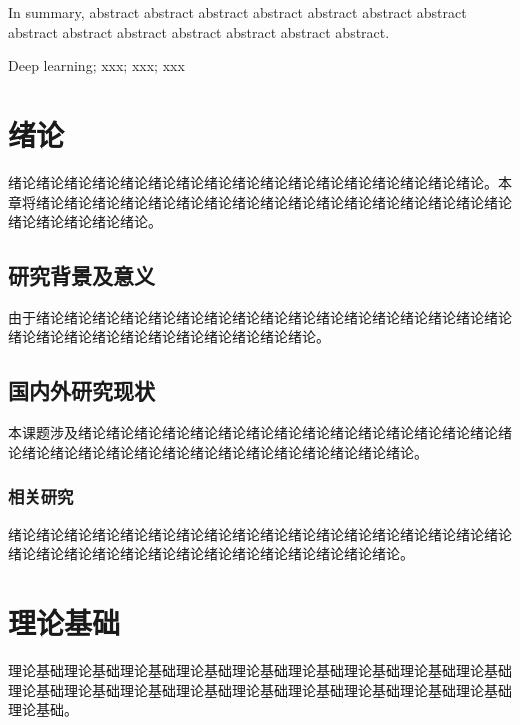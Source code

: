 \documentclass[UTF-8,a4paper,twoside]{article}
\numberwithin{equation}{section} %
\numberwithin{table}{section} %
\numberwithin{figure}{section} %
\begin{document}
In summary, abstract abstract abstract abstract abstract abstract abstract abstract abstract abstract abstract abstract abstract abstract.

\noindent{}Deep learning; xxx; xxx; xxx

\newpage
\thispagestyle{pre}
\begin{center}
	\tableofcontents
\end{center}
\thispagestyle{pre}

\newpage
\pagestyle{main}
\setcounter{page}{1}
\section{绪论}
绪论绪论绪论绪论绪论绪论绪论绪论绪论绪论绪论绪论绪论绪论绪论绪论绪论。本章将绪论绪论绪论绪论绪论绪论绪论绪论绪论绪论绪论绪论绪论绪论绪论绪论绪论绪论绪论绪论绪论绪论。

\subsection{研究背景及意义}
由于绪论\cite{示例期刊论文}绪论绪论绪论绪论绪论绪论绪论绪论绪论绪论\cite{示例书籍}绪论绪论绪论绪论绪论绪论绪论绪论绪论绪论绪论绪论绪论绪论绪论绪论绪论。

\subsection{国内外研究现状}
本课题涉及绪论绪论绪论\cite{示例学位论文}绪论绪论绪论绪论绪论绪论绪论绪论绪论\cite{示例会议论文}绪论绪论绪论绪论绪论绪论绪论绪论绪论绪论绪论绪论绪论绪论绪论绪论绪论绪论。

\subsubsection{相关研究}
绪论绪论绪论绪论绪论绪论绪论绪论\cite{示例期刊论文}绪论绪论绪论绪论绪论绪论绪论绪论绪论绪论绪论\cite{示例在线资源}绪论绪论绪论绪论绪论绪论绪论绪论绪论绪论绪论绪论绪论。

\newpage
\section{理论基础}
理论基础理论基础理论基础理论基础理论基础理\cite{示例在线资源}论基础理论基础理论基础理论基础理论基础理论基础理论基础理论基础理论基础理论基础理论基础理论基础理论基础理论基础。
\end{document}

